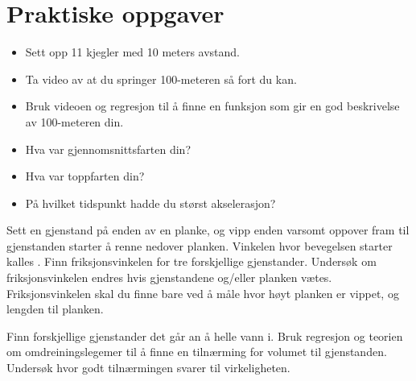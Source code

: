 \section{Praktiske oppgaver}
\begin{itemize}
\item Sett opp 11 kjegler med 10 meters avstand. 
\item Ta video av at du springer 100-meteren så fort du kan. 
\item Bruk videoen og regresjon til å finne en funksjon som gir en god beskrivelse av 100-meteren din. 
\item Hva var gjennomsnittsfarten din?
\item Hva var toppfarten din?
\item På hvilket tidspunkt hadde du størst akselerasjon?
\end{itemize}

Sett en gjenstand på enden av en planke, og vipp enden varsomt oppover fram til gjenstanden starter å renne nedover planken. Vinkelen hvor bevegelsen starter kalles . Finn friksjonsvinkelen for tre forskjellige gjenstander. Undersøk om friksjonsvinkelen endres hvis gjenstandene og/eller planken vætes. Friksjonsvinkelen skal du finne bare ved å måle hvor høyt planken er vippet, og lengden til planken.


Finn forskjellige gjenstander det går an å helle vann i. Bruk regresjon og teorien om omdreiningslegemer til å finne en tilnærming for volumet til gjenstanden. Undersøk hvor godt tilnærmingen svarer til virkeligheten.

\newpage
